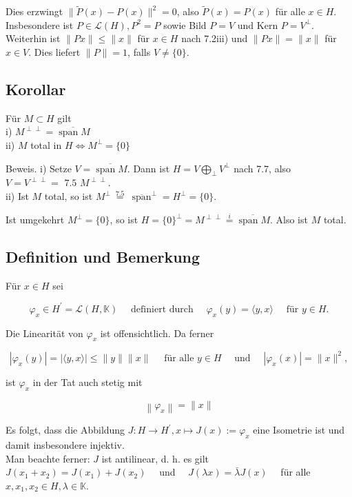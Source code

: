 \documentclass[10pt, letterpaper]{article}
\begin{document}
Dies erzwingt $\|\widetilde{P}(x)-P(x)\|^{2}=0$, also $\widetilde{P}(x)=P(x)$ für alle $x \in H$.\\
Insbesondere ist $P \in \mathcal{L}(H), P^{2}=P$ sowie Bild $P=V$ und Kern $P=V^{\perp}$.\\
Weiterhin ist $\|P x\| \leq\|x\|$ für $x \in H$ nach 7.2iii) und $\|P x\|=\|x\|$ für $x \in V$. Dies liefert $\|P\|=1$, falls $V \neq\{0\}$.

\subsection*{Korollar}
Für $M \subset H$ gilt\\
i) $M^{\perp \perp}=\overline{\operatorname{span} M}$\\
ii) $M$ total in $H \Longleftrightarrow M^{\perp}=\{0\}$

Beweis. i) Setze $V=\overline{\operatorname{span} M}$. Dann ist $H=V \bigoplus_{\perp} V^{\perp}$ nach 7.7, also $V=V^{\perp \perp} ={\text { 7.5 }} M^{\perp \perp}$.\\
ii) Ist $M$ total, so ist $M^{\perp} \stackrel{\text { 7.5 }}{=} \overline{\operatorname{span}}^{\perp}=H^{\perp}=\{0\}$.

Ist umgekehrt $M^{\perp}=\{0\}$, so ist $H=\{0\}^{\perp}=M^{\perp \perp} \stackrel{i}{=} \overline{\operatorname{span} M}$. Also ist $M$ total.

\subsection*{Definition und Bemerkung}
Für $x \in H$ sei

$$
\varphi_{x} \in H^{\prime}=\mathcal{L}(H, \mathbb{K}) \quad \text { definiert durch } \quad \varphi_{x}(y)=\langle y, x\rangle \quad \text { für } y \in H .
$$

Die Linearität von $\varphi_{x}$ ist offensichtlich. Da ferner

$$
\left|\varphi_{x}(y)\right|=|\langle y, x\rangle| \leq\|y\|\|x\| \quad \text { für alle } y \in H \quad \text { und } \quad\left|\varphi_{x}(x)\right|=\|x\|^{2},
$$

ist $\varphi_{x}$ in der Tat auch stetig mit

$$
\left\|\varphi_{x}\right\|=\|x\|
$$

Es folgt, dass die Abbildung $J: H \rightarrow H^{\prime}, x \mapsto J(x):=\varphi_{x}$ eine Isometrie ist und damit insbesondere injektiv.\\
Man beachte ferner: $J$ ist antilinear, d. h. es gilt\\
$J\left(x_{1}+x_{2}\right)=J\left(x_{1}\right)+J\left(x_{2}\right) \quad$ und $\quad J(\lambda x)=\bar{\lambda} J(x) \quad$ für alle $x, x_{1}, x_{2} \in H, \lambda \in \mathbb{K}$.
\end{document}
